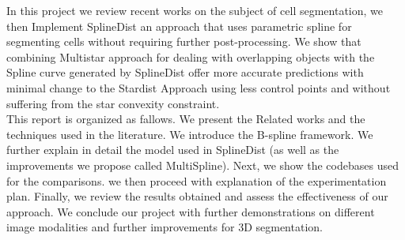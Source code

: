 \documentclass[main.tex]{subfiles}
\begin{document}
In this project we review recent works on the subject of cell segmentation, we then Implement SplineDist\cite{Mandal2020} an approach that uses parametric spline for segmenting cells without requiring further post-processing. We show that combining Multistar\cite{Walter2020} approach for dealing with overlapping objects with the Spline curve generated by SplineDist offer more accurate predictions with minimal change to the Stardist Approach using less control points and without suffering from the star convexity constraint.\\

This report is organized as fallows. We present the Related works and the techniques used in the literature. We introduce the B-spline framework. We further explain in detail the model used in SplineDist (as well as the improvements we propose called MultiSpline). Next, we show the codebases used for the comparisons. we then proceed with explanation of the experimentation plan. Finally, we review the results obtained and assess the effectiveness of our approach. We conclude our project with further demonstrations on different image modalities and further improvements for 3D segmentation.\\


\end{document}
